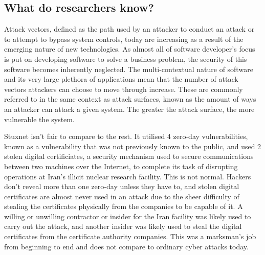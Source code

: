 \documentclass[a4paper, 11pt]{article}
\begin{document}
\subsection{What do researchers know?}
Attack vectors, defined as the path used by an attacker to conduct an attack or to attempt to bypass system controls, \cite{ref:biometricattackvectors} today are increasing as a result of the emerging nature of new technologies. As almost all of software developer's focus is put on developing software to solve a business problem, the security of this software becomes inherently neglected. The multi-contextual nature of software and its very large plethora of applications mean that the number of attack vectors attackers can choose to move through increase. These are commonly referred to in the same context as attack surfaces, known as the amount of ways an attacker can attack a given system. The greater the attack surface, the more vulnerable the system.

Stuxnet isn't fair to compare to the rest. It utilised 4 zero-day vulnerabilities, known as a vulnerability that was not previously known to the public, and used 2 stolen digital certificiates, a security mechanism used to secure communications between two machines over the Internet, \cite{ref:stuxnet2011report} to complete its task of disrupting operations at Iran's illicit nuclear research facility. \cite{ref:singer2014cybersecurity} This is not normal. Hackers don't reveal more than one zero-day unless they have to, and stolen digital certificates are almost never used in an attack due to the sheer difficulty of stealing the certificates physically from the companies to be capable of it. \cite{ref:singer2014cybersecurity} A willing or unwilling contractor or insider for the Iran facility was likely used to carry out the attack, and another insider was likely used to steal the digital certificates from the certificate authority companies. \cite{ref:stuxnet2011report} This was a marksman's job from beginning to end and does not compare to ordinary cyber attacks today. \cite{ref:stuxnet2011report}
\end{document}
